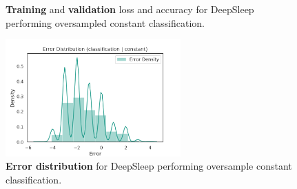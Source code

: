 \documentclass[11pt]{scrartcl}
\begin{document}
\begin{figure}[!hbt]
	\caption{\textcolor{viridis9}{\textbf{Training}} and \textcolor{viridis0}{\textbf{validation}} loss and accuracy for DeepSleep performing oversampled constant classification.}
\end{figure}

\begin{figure}[hbt]
	\centering
	\includegraphics[width=0.6\textwidth]{img/learning/original_physionet_sleepnet_classification_constant_oversample_unweighted_error_distribution.png}
	\caption{\textcolor{viridis5}{\textbf{Error distribution}} for DeepSleep performing oversample constant classification.}
	\label{fig:original_physionet_sleepnet_classification_constant_oversample_unweighted_error_distribution}
\end{figure}
\end{document}
